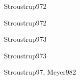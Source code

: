 \begin{syllabus}
\begin{unit}{\PFFOURDef}{Stroustrup97}{2}
\begin{unitgoals}
   \end{unitgoals}
\end{unit}

\begin{unit}{\PFFIVEDef}{Stroustrup97}{2}
   \PFFIVEAllTopics
   \PFFIVEAllObjectives
\end{unit}

\begin{unit}{\ALONEDef}{Stroustrup97}{3}
   \begin{topics}
      \item \ALONETopicAnalisis
      \item \ALONETopicIdentificar
   \end{topics}
   \begin{unitgoals}
      \item \ALONEObjTHREE
   \end{unitgoals}
\end{unit}

\begin{unit}{\ALTHREEDef}{Stroustrup97}{3}
   \begin{topics}
      \item \ALTHREETopicAlgoritmos
      \item \ALTHREETopicBusqueda
      \item \ALTHREETopicRepresentacion
      \item \ALTHREETopicOrdenamiento
   \end{topics}
   \begin{unitgoals}
      \item \ALTHREEObjONE
      \item \ALTHREEObjSIX
   \end{unitgoals}
\end{unit}
\begin{unit}{\PLTWODef}{Stroustrup97, Meyer98}{2}
   \begin{topics}
      \item \PLTWOTopicEl
      \item \PLTWOTopicLenguajes
      \item \PLTWOTopicTemas
   \end{topics}

   \begin{unitgoals}
      \item \PLTWOObjONE
      \item \PLTWOObjTWO
      \item \PLTWOObjTHREE
      \item \PLTWOObjTHREE
   \end{unitgoals}
\end{unit}


\end{syllabus}
